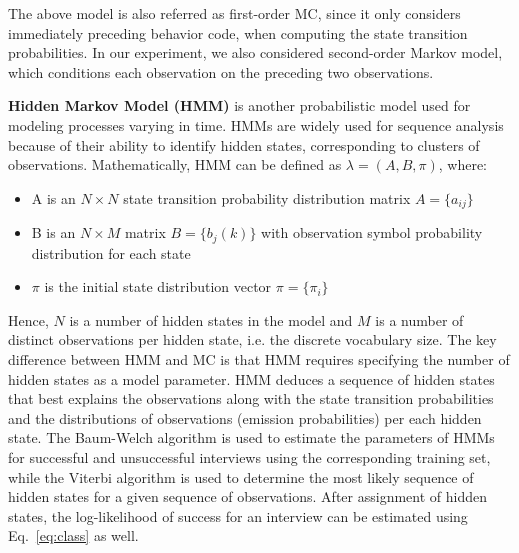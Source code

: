 \documentclass{amia_summit_2018}
\begin{document}
The above model is also referred as first-order MC, since it only considers immediately preceding behavior code, when computing the state transition probabilities. In our experiment, we also considered second-order Markov model, which conditions each observation on the preceding two observations.  

\textbf {Hidden Markov Model (HMM)} is another probabilistic model used for modeling processes varying in time. HMMs are widely used for sequence analysis because of their ability to identify hidden states, corresponding to clusters of observations. Mathematically, HMM can be defined as $\lambda = (A, B, \pi)$, where:
\begin{itemize}
\item A is an $N\times N$ state transition probability distribution matrix $A = \{a_{ij}\}$
\item B is an $N\times M$ matrix $B = \{b_j(k)\}$ with observation symbol probability distribution for each state 
\item $\pi$ is the initial state distribution vector $\pi = \{\pi_i\}$
\end{itemize}
Hence, $N$ is a number of hidden states in the model and $M$ is a number of distinct observations per hidden state, i.e. the discrete vocabulary size. The key difference between HMM and MC is that HMM requires specifying the number of hidden states as a model parameter. HMM deduces a sequence of hidden states that best explains the observations along with the state transition probabilities and the distributions of observations (emission probabilities) per each hidden state. The Baum-Welch algorithm \cite{rabiner1989tutorial} is used to estimate the parameters of HMMs for successful and unsuccessful interviews using the corresponding training set, while the Viterbi algorithm \cite{rabiner1989tutorial} is used to determine the most likely sequence of hidden states for a given sequence of observations. After assignment of hidden states, the log-likelihood of success for an interview can be estimated using Eq.~\ref{eq:class} as well.
\end{document}
